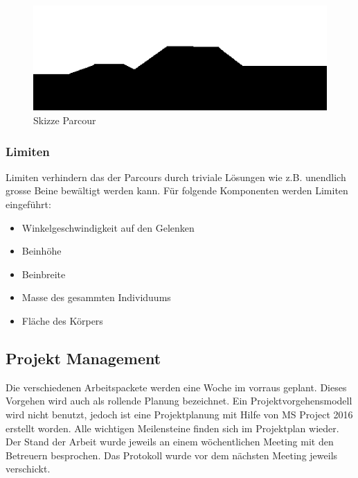       \begin{figure}[H]
        \includegraphics[scale=1]{graphics/scetch_parcours}
        \caption{Skizze Parcour\label{fig:scetchParcours}}
      \end{figure}


    \subsubsection{Limiten}
      Limiten verhindern das der Parcours durch triviale Lösungen wie z.B. unendlich grosse Beine bewältigt werden kann.
      Für folgende Komponenten werden Limiten eingeführt:
      \begin{itemize}
        \item Winkelgeschwindigkeit auf den Gelenken
        \item Beinhöhe
        \item Beinbreite
        \item Masse des gesammten Individuums
        \item Fläche des Körpers
      \end{itemize}

    \subsection{Projekt Management}
      Die verschiedenen Arbeitspackete werden eine Woche im vorraus geplant.
      Dieses Vorgehen wird auch als rollende Planung bezeichnet.
      Ein Projektvorgehensmodell wird nicht benutzt, jedoch ist eine Projektplanung mit Hilfe von MS Project 2016
      erstellt worden. Alle wichtigen Meilensteine finden sich im Projektplan wieder.
      Der Stand der Arbeit wurde jeweils an einem wöchentlichen Meeting mit den Betreuern besprochen.
      Das Protokoll wurde vor dem nächsten Meeting jeweils verschickt.
